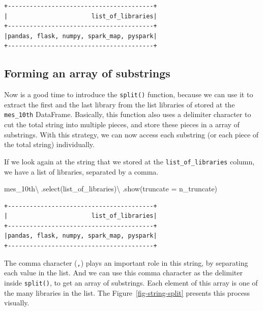 \documentclass[
  11pt,
  letterpaper,
  DIV=11,
  numbers=noendperiod]{scrreprt}
\newenvironment{Shaded}{\begin{snugshade}}{\end{snugshade}}
\newcommand{\NormalTok}[1]{\textcolor[rgb]{0.00,0.23,0.31}{#1}}
\newcommand{\OperatorTok}[1]{\textcolor[rgb]{0.37,0.37,0.37}{#1}}
\newcommand{\StringTok}[1]{\textcolor[rgb]{0.13,0.47,0.30}{#1}}
\begin{document}
\begin{verbatim}
+----------------------------------------+
|                       list_of_libraries|
+----------------------------------------+
|pandas, flask, numpy, spark_map, pyspark|
+----------------------------------------+
\end{verbatim}

\hypertarget{forming-an-array-of-substrings}{%
\subsection{Forming an array of
substrings}\label{forming-an-array-of-substrings}}

Now is a good time to introduce the \texttt{split()} function, because
we can use it to extract the first and the last library from the list
libraries of stored at the \texttt{mes\_10th} DataFrame. Basically, this
function also uses a delimiter character to cut the total string into
multiple pieces, and store these pieces in a array of substrings. With
this strategy, we can now access each substring (or each piece of the
total string) individually.

If we look again at the string that we stored at the
\texttt{list\_of\_libraries} column, we have a list of libraries,
separated by a comma.

\begin{Shaded}
\begin{Highlighting}[]
\NormalTok{mes\_10th}\OperatorTok{\textbackslash{}}
\NormalTok{    .select(}\StringTok{\textquotesingle{}list\_of\_libraries\textquotesingle{}}\NormalTok{)}\OperatorTok{\textbackslash{}}
\NormalTok{    .show(truncate }\OperatorTok{=}\NormalTok{ n\_truncate)}
\end{Highlighting}
\end{Shaded}

\begin{verbatim}
+----------------------------------------+
|                       list_of_libraries|
+----------------------------------------+
|pandas, flask, numpy, spark_map, pyspark|
+----------------------------------------+
\end{verbatim}

The comma character (\texttt{,}) plays an important role in this string,
by separating each value in the list. And we can use this comma
character as the delimiter inside \texttt{split()}, to get an array of
substrings. Each element of this array is one of the many libraries in
the list. The Figure~\ref{fig-string-split} presents this process
visually.
\end{document}
